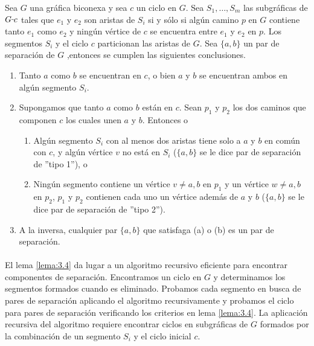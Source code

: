 \begin{lemma}
Sea $G$ una gráfica biconexa y sea $c$ un ciclo en $G$. Sea $S_{1}, \ldots, S_{m}$ las subgráficas de $G \rule[1mm]{.1cm}{0.4pt} c$ tales que $e_{1}$ y $e_{2}$ son aristas de $S_{i}$ si y sólo si algún camino $p$ en $G$ contiene tanto $e_{1}$ como $e_{2}$ y ningún vértice de $c$ se encuentra entre $e_{1}$ y $e_{2}$ en $p$. Los segmentos $S_{i}$ y el ciclo $c$ particionan las aristas de $G$. Sea $\{a, b\}$ un par de separación de $G$ ,entonces se cumplen las siguientes conclusiones.
\begin{enumerate}
\item Tanto $a$ como $b$ se encuentran en $c$, o bien $a$ y $b$ se encuentran ambos en algún segmento $S_{i}$.
\item Supongamos que tanto $a$ como $b$ están en $c$. Sean $p_{1}$ y $p_{2}$ los dos caminos que componen $c$ los cuales unen $a$ y $b$. Entonces o
\begin{enumerate}
\item Algún segmento $S_{i}$ con al menos dos aristas tiene solo a $a$ y $b$ en común con $c$, y algún vértice $v$ no está en $S_{i}$ ($\{a, b\}$ se le dice par de separación de ''tipo 1''), o
\item Ningún segmento contiene un vértice $v \neq a, b$ en $p_{1}$ y un vértice $w \neq a, b$ en $p_{2}$, $p_{1}$ y $p_{2}$ contienen cada uno un vértice además de $a$ y $b$ ($\{a, b\}$ se le dice par de separación de ''tipo 2'').
\end{enumerate}
\item A la inversa, cualquier par $\{a, b\}$ que satisfaga (a) o (b) es un par de separación.
\end{enumerate}
\label{lema:3.4}
\end{lemma}

\paragraph{}

El lema \ref{lema:3.4} da lugar a un algoritmo recursivo eficiente para encontrar componentes de separación. Encontramos un ciclo en $G$ y determinamos los segmentos formados cuando es eliminado. Probamos cada segmento en busca de pares de separación aplicando el algoritmo recursivamente y probamos el ciclo para pares de separación verificando los criterios en lema \ref{lema:3.4}. La aplicación recursiva del algoritmo requiere encontrar ciclos en subgráficas de $G$ formados por la combinación de un segmento $S_{i}$ y el ciclo inicial $c$.

